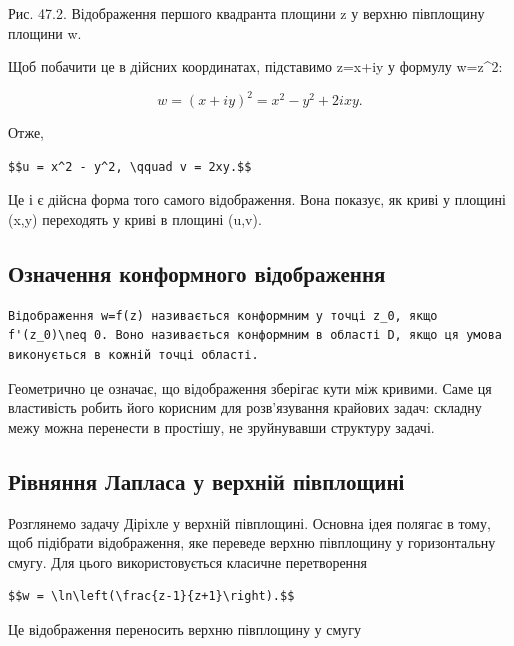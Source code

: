 \documentclass[
  ukrainian,
]{article}
\begin{document}
Рис. 47.2. Відображення першого квадранта площини z у верхню півплощину
площини w.

Щоб побачити це в дійсних координатах, підставимо z=x+iy у формулу
w=z\^{}2:

\[w = (x+iy)^2 = x^2 - y^2 + 2ixy.\]

Отже,

\begin{verbatim}
$$u = x^2 - y^2, \qquad v = 2xy.$$
\end{verbatim}

Це і є дійсна форма того самого відображення. Вона показує, як криві у
площині (x,y) переходять у криві в площині (u,v).

\subsection{Означення конформного
відображення}\label{ux43eux437ux43dux430ux447ux435ux43dux43dux44f-ux43aux43eux43dux444ux43eux440ux43cux43dux43eux433ux43e-ux432ux456ux434ux43eux431ux440ux430ux436ux435ux43dux43dux44f}

\begin{verbatim}
Відображення w=f(z) називається конформним у точці z_0, якщо f'(z_0)\neq 0. Воно називається конформним в області D, якщо ця умова виконується в кожній точці області.
\end{verbatim}

Геометрично це означає, що відображення зберігає кути між кривими. Саме
ця властивість робить його корисним для розв'язування крайових задач:
складну межу можна перенести в простішу, не зруйнувавши структуру
задачі.

\subsection{Рівняння Лапласа у верхній
півплощині}\label{ux440ux456ux432ux43dux44fux43dux43dux44f-ux43bux430ux43fux43bux430ux441ux430-ux443-ux432ux435ux440ux445ux43dux456ux439-ux43fux456ux432ux43fux43bux43eux449ux438ux43dux456}

Розглянемо задачу Діріхле у верхній півплощині. Основна ідея полягає в
тому, щоб підібрати відображення, яке переведе верхню півплощину у
горизонтальну смугу. Для цього використовується класичне перетворення

\begin{verbatim}
$$w = \ln\left(\frac{z-1}{z+1}\right).$$
\end{verbatim}

Це відображення переносить верхню півплощину у смугу
\end{document}
